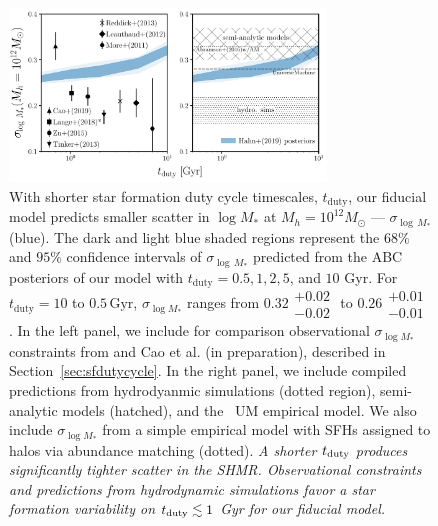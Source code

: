 \documentclass[12pt, letterpaper, preprint, tighten]{aastex62}
\newcommand{\edt}[1]{{\color{dred}{\bf} #1}}
\newcommand{\tduty}{t_{\rm duty}}
\newcommand{\siglogm}{\sigma_{\log M_*}}
\begin{document}
\begin{figure}
\begin{center}
\includegraphics[width=0.75\textwidth]{figs/SHMRscatter_tduty_v2.pdf}
    \caption{With shorter star formation duty cycle timescales, $t_\mathrm{duty}$,
    our \edt{fiducial}
    model predicts smaller scatter in $\log M_*$ at
    $M_h = 10^{12} M_\odot$ --- $\sigma_{\log\,M_*}$ (blue). The dark and light blue
    shaded regions represent the $68\%$ and $95\%$ confidence
    intervals of $\sigma_{\log\,M_*}$ predicted from the ABC posteriors of our
    model with $t_\mathrm{duty} = 0.5, 1, 2, 5$, and $10$ Gyr. For $t_\mathrm{duty} = 10$
    to $0.5\,\mathrm{Gyr}$, $\siglogm$ ranges from $0.32\substack{+0.02\\ -0.02}$ to
    $0.26\substack{+0.01\\-0.01}$. In the left panel, we include for comparison
    observational $\siglogm$ constraints from \cite{yang2009, more2011, leauthaud2012, zu2015, tinker2017, lange2018a}
    and Cao et al. (in preparation), described in Section~\ref{sec:sfdutycycle}.
    In the right panel, we include compiled predictions from hydrodyanmic simulations
    (dotted region), semi-analytic models (hatched), and
    \edt{the~\cite{behroozi2018} {\sc UM} empirical model. We also include $\siglogm$
    from a simple empirical model with \cite{abramson2016} SFHs assigned to halos via
    abundance matching (dotted).}
    \edt{\emph{A shorter $\tduty$ produces significantly tighter scatter in the SHMR.
    Observational constraints and predictions from hydrodynamic simulations
    favor a star formation variability on $\tduty \lesssim 1$ Gyr for our fiducial
    model.}}
    }
\label{fig:sigMstar_duty}
\end{center}
\end{figure}
\end{document}
